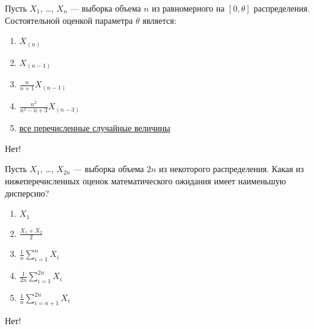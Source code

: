 \documentclass[t]{beamer}
\begin{document}
 \begin{frame} \label{4-No} 
\begin{block}{4} 

Пусть $X_1$, \ldots, $X_n$ — выборка объема $n$ из равномерного на $[0, \theta]$ распределения. Состоятельной оценкой параметра $\theta$ является:
 


 \end{block} 
\begin{enumerate} 
\item[] \hyperlink{4-No}{\beamergotobutton{} $X_{(n)}$}
\item[] \hyperlink{4-No}{\beamergotobutton{} $X_{(n-1)}$}
\item[] \hyperlink{4-No}{\beamergotobutton{} $\frac{n}{n+1} X_{(n-1)}$}
\item[] \hyperlink{4-No}{\beamergotobutton{} $\frac{n^2}{n^2-n+3} X_{(n-3)}$}
\item[] \hyperlink{4-Yes}{\beamergotobutton{} все перечисленные случайные величины}
\end{enumerate} 

 \alert{Нет!} 
\end{frame} 


 \begin{frame} \label{5-No} 
\begin{block}{5} 

Пусть $X_1$, \ldots, $X_{2 n}$ — выборка объема $2 n$ из некоторого распределения. Какая из нижеперечисленных оценок математического ожидания имеет наименьшую дисперсию?
 


 \end{block} 
\begin{enumerate} 
\item[] \hyperlink{5-No}{\beamergotobutton{} $X_1$}
\item[] \hyperlink{5-No}{\beamergotobutton{} $\frac{X_1+X_2}{2}$}
\item[] \hyperlink{5-No}{\beamergotobutton{} $\frac{1}{n} \sum_{i=1}^n X_i$}
\item[] \hyperlink{5-Yes}{\beamergotobutton{} $\frac{1}{2 n} \sum_{i=1}^{2 n} X_i$}
\item[] \hyperlink{5-No}{\beamergotobutton{} $\frac{1}{n} \sum_{i=n+1}^{2 n} X_i$}
\end{enumerate} 

 \alert{Нет!} 
\end{frame} 
\end{document}
